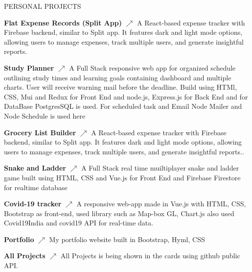 \documentclass{resume} %
\begin{document}
\begin{rSection}{PERSONAL PROJECTS}
            
\item \textbf{Flat Expense Records (Split App)}
\href{https://github.com/Kash15if/react-flat-expense-record}{\texorpdfstring{\(\nearrow\)}{nearrow}}
{A React-based expense tracker with Firebase backend, similar to Split app. It features dark and light mode options, allowing users to manage expenses, track multiple users, and generate insightful reports.}



\item \textbf{Study Planner} 
\href{https://study-planner-phi.vercel.app/dashboard}{\texorpdfstring{\(\nearrow\)}{nearrow}}
{A Full Stack responsive web app for organized schedule outlining study times and learning goals containing dashboard and multiple charts. User will receive warning mail before the deadline. Build using HTMl, CSS, Mui and Redux for Front End and node.js, Express.js for Back End and for DataBase PostgresSQL is used. For scheduled task and Email Node Mailer and Node Schedule is used here}


\item {\bf Grocery List Builder}
\href{https://react-grocery-list-firebase.vercel.app/}{\texorpdfstring{\(\nearrow\)}{nearrow}}  {A React-based expense tracker with Firebase backend, similar to Split app. It features dark and light mode options, allowing users to manage expenses, track multiple users, and generate insightful reports..}


\item {\bf Snake and Ladder}
\href{https://vue-snake-ladder.vercel.app/}{\texorpdfstring{\(\nearrow\)}{nearrow}}
{A Full Stack real time muiltiplayer snake and ladder game built using HTML, CSS and Vue.js for Front End and Firebase Firestore for realtime database}

 
\item \textbf{Covid-19 tracker} 
\href{https://covid19status.vercel.app/}{\texorpdfstring{\(\nearrow\)}{nearrow}}
{A responsive web-app made in Vue.js with HTML, CSS, Bootstrap as front-end, used library such as Map-box GL,
			Chart.js also used Covid19India and covid19 API for real-time
			data.}


\item \textbf{Portfolio}
\href{https://portfolio.kashif.world/}{\texorpdfstring{\(\nearrow\)}{nearrow}}
{My portfolio website built in Bootstrap, Hyml, CSS}



\item {\bf All Projects}
\href{https://myprojects.vercel.app/}{\texorpdfstring{\(\nearrow\)}{nearrow}}  {All Projects is being shown in the cards using github public API.}
\item 

\end{rSection}
\end{document}
